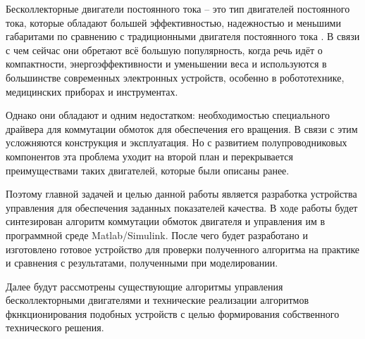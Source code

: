 \Introduction
\thispagestyle{empty}

Бесколлекторные двигатели постоянного тока – это тип двигателей постоянного тока, которые обладают большей эффективностью, надежностью и меньшими габаритами по сравнению с традиционными двигателя постоянного тока \cite{book.itmo_motors}. В связи с чем сейчас они обретают всё большую популярность, когда речь идёт о компактности, энергоэффективности и уменьшении веса и используются в большинстве современных электронных устройств, особенно в робототехнике, медицинских приборах и инструментах. 

Однако они обладают и одним недостатком: необходимостью специального драйвера для коммутации обмоток для обеспечения его вращения. В связи с этим усложняются конструкция и эксплуатация. Но с развитием полупроводниковых компонентов эта проблема уходит на второй план и перекрывается преимуществами таких двигателей, которые были описаны ранее.

Поэтому главной задачей и целью данной работы является разработка устройства управления для обеспечения заданных показателей качества. В ходе работы будет синтезирован алгоритм коммутации обмоток двигателя и управления им в программной среде Matlab/Simulink. После чего будет разработано и изготовлено готовое устройство для проверки полученного алгоритма на практике и сравнения с результатами, полученными при моделировании. 

Далее будут рассмотрены существующие алгоритмы управления бесколлекторными двигателями и технические реализации алгоритмов фкнкционирования подобных устройств с целью формирования собственного технического решения.




